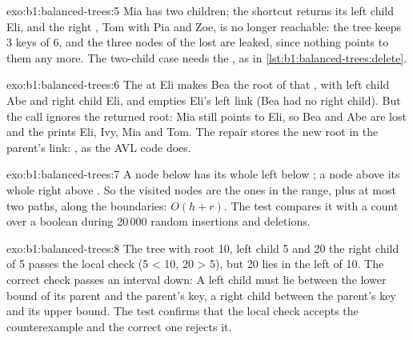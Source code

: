 \begin{solution}{exo:b1:balanced-trees:5}
Mia has two children; the shortcut returns its left child Eli, and the right , Tom with Pia and Zoe, is no longer
reachable: the tree keeps 3 keys of 6, and the three nodes of the lost  are leaked, since nothing points to them
any more. The two-child case needs the , as in \cref{lst:b1:balanced-trees:delete}.
\end{solution}

\begin{solution}{exo:b1:balanced-trees:6}
The  at Eli makes Bea the root of that , with left child Abe and right child Eli, and empties Eli's left
link (Bea had no right child). But the call ignores the returned root: Mia still points to Eli, so Bea and Abe are lost
and the  prints Eli, Ivy, Mia and Tom. The repair stores the new root in the parent's link:
, as the AVL code does.
\end{solution}

\begin{solution}{exo:b1:balanced-trees:7}
A node below  has its whole left  below ; a node above  its whole right  above
. So the visited nodes are the ones in the range, plus at most two paths, along the boundaries: $O(h + r)$. The
test compares it with a count over a boolean  during 20\,000 random insertions and deletions.
\end{solution}

\begin{solution}{exo:b1:balanced-trees:8}
The tree with root 10, left child 5 and 20 the right child of 5 passes the local check (5 < 10, 20 > 5), but 20 lies in
the left  of 10. The correct check passes an interval down:
A left child must lie between the lower bound of its parent and the parent's key, a right child between the parent's key
and its upper bound. The test confirms that the local check accepts the counterexample and the correct one rejects it.
\end{solution}

